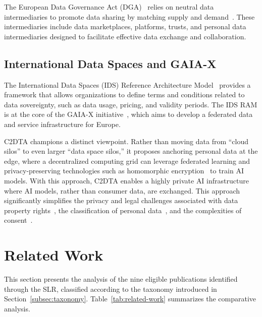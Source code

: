 The European Data Governance Act (DGA)~\cite{taylor:mukiri:petrocnik:etal:2022} relies on neutral data intermediaries to promote data sharing by matching supply and demand~\cite{baloup:bayamlioglu:benmayor:etal:2021}.
These intermediaries include data marketplaces, platforms, trusts, and personal data intermediaries designed to facilitate effective data exchange and collaboration.

\subsection{International Data Spaces and GAIA-X}
\label{subsec:gaia-x}

The International Data Spaces (IDS) Reference Architecture Model~\cite{otto:ten:hompel:wrobel:2022,auer:2022} provides a framework that allows organizations to define terms and conditions related to data sovereignty, such as data usage, pricing, and validity periods.
The IDS RAM is at the core of the GAIA-X initiative~\cite{beverungen:hess:koster:etal:2022}, which aims to develop a federated data and service infrastructure for Europe.

\ac{C2DTA} champions a distinct viewpoint.
Rather than moving data from ``cloud silos'' to even larger ``data space silos,'' it proposes anchoring personal data at the edge, where a decentralized computing grid can leverage federated learning and privacy-preserving technologies such as homomorphic encryption~\cite{she:gu:lyu:etal:2019} to train \ac{AI} models.
With this approach, \ac{C2DTA} enables a highly private \ac{AI} infrastructure where \ac{AI} models, rather than consumer data, are exchanged.
This approach significantly simplifies the privacy and legal challenges associated with data property rights~\cite{finck:2018,ishmaev:2020,osborne:clarke:2016}, the classification of personal data~\cite{janecek:2018}, and the complexities of consent~\cite{lehtiniemi:kortesniemi:2017,solove:2013}.

\section{Related Work}
\label{sec:related-work}

\noindent This section presents the analysis of the nine eligible publications identified through the \ac{SLR}, classified according to the taxonomy introduced in Section~\ref{subsec:taxonomy}.
Table~\ref{tab:related-work} summarizes the comparative analysis.

